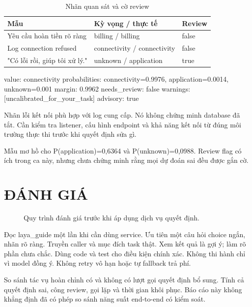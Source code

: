 \documentclass[10pt,a4paper]{article}
\begin{document}
\begin{table}[H]
\centering\small
\renewcommand{\arraystretch}{1.15}
\begin{tabularx}{\linewidth}{@{}YYY@{}}
\toprule
\textbf{Mẫu} & \textbf{Kỳ vọng / thực tế} & \textbf{Review} \\
\midrule
Yêu cầu hoàn tiền rõ ràng & billing / billing & false \\
Log connection refused & connectivity / connectivity & false \\
"Có lỗi rồi, giúp tôi xử lý." & unknown / application & true \\
\bottomrule
\end{tabularx}
\caption{Nhãn quan sát và cờ review}
\end{table}
\begin{Code}
value: connectivity
probabilities: connectivity=0.9976, application=0.0014, unknown=0.001
margin: 0.9962
needs_review: false
warnings: [uncalibrated_for_your_task]
advisory: true
\end{Code}
Nhãn lỗi kết nối phù hợp với log cung cấp. Nó không chứng minh database đã tắt. Cần kiểm tra listener, cấu hình endpoint và khả năng kết nối từ đúng môi trường thực thi trước khi quyết định sửa gì.

Mẫu mơ hồ cho P(application)=0,6364 và P(unknown)=0,0988. Review flag có ích trong ca này, nhưng chưa chứng minh rằng mọi dự đoán sai đều được gắn cờ.

\section{ĐÁNH GIÁ}
\begin{figure}[H]
\centering
{}
\caption{Quy trình đánh giá trước khi áp dụng dịch vụ quyết định.}
\end{figure}
\begin{Code}
Đọc laya_guide một lần khi cần dùng service.
Ưu tiên một câu hỏi choice ngắn, nhãn rõ ràng.
Truyền caller và mục đích task thật.
Xem kết quả là gợi ý; làm rõ phần chưa chắc.
Dùng code và test cho điều kiện chính xác.
Không thi hành chỉ vì model đồng ý.
Không retry vô hạn hoặc tự fallback trả phí.
\end{Code}
So sánh tác vụ hoàn chỉnh có và không có lượt gọi quyết định bổ sung. Tính cả quyết định sai, công review, gọi lặp và thời gian khôi phục. Báo cáo này không khẳng định đã có phép so sánh năng suất end-to-end có kiểm soát.
\end{document}
